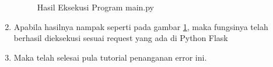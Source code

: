 \begin{enumerate}
\begin{figure}[!htbp]
	\caption{Hasil Eksekusi Program main.py}
	\label{fig:hasil_delete}
\end{figure}
\item Apabila hasilnya nampak seperti pada gambar \ref{fig:hasil_delete}, maka fungsinya telah berhasil dieksekusi sesuai request yang ada di Python Flask
\item Maka telah selesai pula tutorial penanganan error ini.
\end{enumerate}